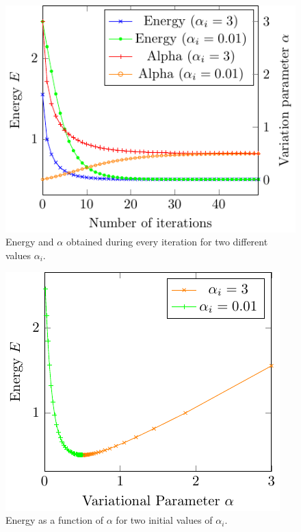 \begin{figure}[th]
	\begin{center}
		\includegraphics[scale=0.9]{graphs/ho-e-alpha-iterations.pdf}
		\caption{
			Energy and $\alpha$ obtained during every iteration for two different values $\alpha_i$.
			}
		\label{fig:Ho_it}
	\end{center}
\end{figure}
\begin{figure}[th]
	\begin{center}
		\includegraphics[scale=0.9]{graphs/ho-e-alpha.pdf}
		\caption{
			Energy as a function of $\alpha$ for two initial values of $\alpha_i$.
		}
		\label{fig:Ho_rel}
	\end{center}
\end{figure}


